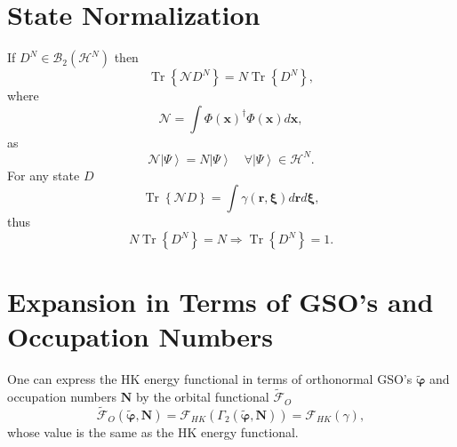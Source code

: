 \documentclass[aps,preprint]{revtex4}%
\begin{document}
\section{State Normalization \label{Normalization}}

If $D^{N}\in\mathcal{B}_{2}\left(  \mathcal{H}^{N}\right)  $ then
\begin{equation}
\operatorname{Tr}\left\{  \mathcal{N}D^{N}\right\}  =N\operatorname{Tr}%
\left\{  D^{N}\right\}  ,
\end{equation}
where
\begin{equation}
\mathcal{N}=\int\Phi\left(  \boldsymbol{x}\right)  ^{\dagger}\Phi\left(
\boldsymbol{x}\right)  d\boldsymbol{x,}%
\end{equation}
as
\begin{equation}
\mathcal{N}\left\vert \Psi\right\rangle =N\left\vert \Psi\right\rangle
\quad\forall\left\vert \Psi\right\rangle \in\mathcal{H}^{N}.
\end{equation}
For any state $D$
\begin{equation}
\operatorname{Tr}\left\{  \mathcal{N}D\right\}  =\int\gamma\left(
\boldsymbol{r,\xi}\right)  d\boldsymbol{r}d\boldsymbol{\xi,}%
\end{equation}
thus
\begin{equation}
N\operatorname{Tr}\left\{  D^{N}\right\}  =N\Rightarrow\operatorname{Tr}%
\left\{  D^{N}\right\}  =1.
\end{equation}


\section{Expansion in Terms of GSO's and Occupation Numbers\label{GSO&Occ}}

One can express the HK energy functional in terms of orthonormal GSO's
$\boldsymbol{\tilde{\varphi}}$ and occupation numbers $\boldsymbol{N}$ by the
orbital functional $\mathcal{\tilde{F}}_{O}$
\begin{equation}
\mathcal{\tilde{F}}_{O}\left(  \boldsymbol{\tilde{\varphi},N}\right)
=\mathcal{F}_{HK}\left(  \Gamma_{2}\left(  \boldsymbol{\tilde{\varphi}%
,N}\right)  \right)  =\mathcal{F}_{HK}\left(  \gamma\right)  ,
\end{equation}
whose value is the same as the HK energy functional.
\end{document}
